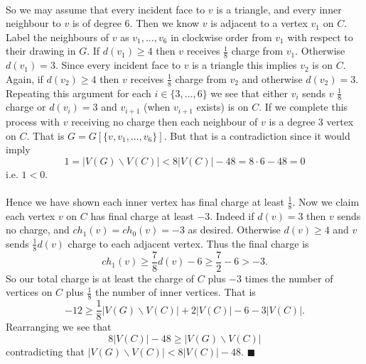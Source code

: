 \documentclass[letterpaper,12pt,oneside,onecolumn]{article}
\begin{document}
\paragraph{}
So we may assume that every incident face to $v$ is a triangle, and every inner neighbour to $v$ is of degree $6$. Then we know $v$ is adjacent to a vertex $v_1$ on $C$. Label the neighbours of $v$ as $v_1, \dots, v_6$ in clockwise order from $v_1$ with respect to their drawing in $G$. If $d(v_1) \geq 4$ then $v$ receives $\frac{1}{8}$ charge from $v_1$. Otherwise $d(v_1) = 3$. Since every incident face to $v$ is a triangle this implies $v_2$ is on $C$.  Again, if $d(v_2) \geq 4$ then $v$ receives $\frac{1}{8}$ charge from $v_2$ and otherwise $d(v_2) = 3$. Repeating this argument for each $i \in \{3, \dots, 6\}$ we see that either $v_i$ sends $v$ $\frac{1}{8}$ charge or $d(v_i) = 3$ and $v_{i+1}$ (when $v_{i+1}$ exists) is on $C$. If we complete this process with $v$ receiving no charge then each neighbour of $v$ is a degree $3$ vertex on $C$. That is $G = G[\{v,v_1, \dots, v_6\}]$. But that is a contradiction since it would imply
$$1 = |V(G) \backslash V(C)|  < 8|V(C)| - 48 = 8\cdot 6 - 48 = 0$$
i.e. $1 < 0$.
\paragraph{}
Hence we have shown each inner vertex has final charge at least $\frac{1}{8}$. Now we claim each vertex $v$ on $C$ has final charge at least $-3$. Indeed if $d(v) = 3$ then $v$ sends no charge, and $ch_1(v) = ch_0(v) = -3$ as desired. Otherwise $d(v) \geq 4$ and $v$ sends $\frac{1}{8}d(v)$ charge to each adjacent vertex. Thus the final charge is
$$ch_1(v) \geq \frac{7}{8}d(v) - 6 \geq \frac{7}{2} - 6 > -3.$$
So our total charge is at least the charge of $C$ plus $-3$ times the number of vertices on $C$ plus $\frac{1}{8}$ the number of inner vertices. That is
$$-12 \geq \frac{1}{8}|V(G)\backslash V(C)| + 2|V(C)| - 6 -3|V(C)|.$$
Rearranging we see that
$$8|V(C)| - 48 \geq |V(G) \backslash V(C)|$$
contradicting that $|V(G)\backslash V(C)| < 8|V(C)| - 48.$ $\blacksquare$
\end{document}
